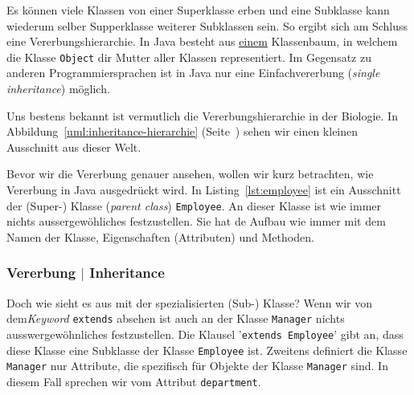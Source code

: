Es können viele Klassen von einer Superklasse erben und eine Subklasse kann wiederum
selber Supperklasse weiterer Subklassen sein. So ergibt sich am Schluss eine
Vererbungshierarchie. In Java besteht aus \underline{einem} Klassenbaum, in welchem
die Klasse \texttt{Object} dir Mutter aller Klassen representiert. Im Gegensatz zu
anderen Programmiersprachen ist in Java nur eine Einfachvererbung (\emph{single
inheritance}) möglich.

Uns bestens bekannt ist vermutlich die Vererbungshierarchie in der Biologie. In
Abbildung~\ref{uml:inheritance-hierarchie} (Seite~\pageref{uml:inheritance-hierarchie})
sehen wir einen kleinen Ausschnitt aus dieser Welt.

Bevor wir die Vererbung genauer ansehen, wollen wir kurz betrachten, wie Vererbung in Java
ausgedrückt wird. In Listing~\ref{lst:employee} ist ein Ausschnitt der (Super-) Klasse
(\emph{parent class}) \texttt{Employee}. An dieser Klasse ist wie immer nichts aussergewöhliches
festzustellen. Sie hat de Aufbau wie immer mit dem Namen der Klasse, Eigenschaften (Attributen)
und Methoden.

\begin{frame}[fragile]
    \frametitle<presentation>{Vererbung $|$ Inheritance}
\end{frame}



Doch wie sieht es aus mit der spezialisierten (Sub-) Klasse? Wenn wir von dem\emph{Keyword}
\texttt{extends} absehen ist auch an der Klasse \texttt{Manager} nichts
ausswergewöhnliches festzustellen. Die Klausel '\texttt{extends Employee}' gibt an,
dass diese Klasse eine Subklasse der Klasse \texttt{Employee} ist. Zweitens definiert
die Klasse \texttt{Manager} nur Attribute, die spezifisch für Objekte der Klasse
\texttt{Manager} sind. In diesem Fall sprechen wir vom Attribut \texttt{department}.

